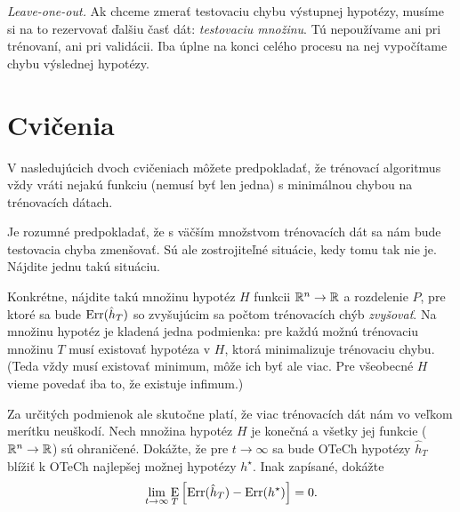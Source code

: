 \emph{Leave-one-out.} Ak chceme zmerať testovaciu chybu
výstupnej hypotézy, musíme si na to rezervovať ďalšiu časť dát:
\emph{testovaciu množinu}. Tú nepoužívame ani pri trénovaní, ani
pri validácii. Iba úplne na konci celého procesu na nej vypočítame
chybu výslednej hypotézy.




\section{Cvičenia}

V nasledujúcich dvoch cvičeniach môžete predpokladať, že trénovací
algoritmus vždy vráti nejakú funkciu (nemusí byť len jedna)
s minimálnou chybou na trénovacích dátach.

\begin{exercise}
  Je rozumné predpokladať, že s väčším množstvom trénovacích dát sa nám
  bude testovacia chyba zmenšovať. Sú ale zostrojiteľné situácie, kedy
  tomu tak nie je. Nájdite jednu takú situáciu.
  
  Konkrétne, nájdite takú množinu hypotéz $H$ funkcii $\mathbb{R}^n \to \mathbb{R}$
  a rozdelenie $P$, pre ktoré sa bude $\mathrm{Err}(\hat{h}_T)$ so zvyšujúcim
  sa počtom trénovacích chýb \emph{zvyšovať}. Na množinu hypotéz je
  kladená jedna podmienka: pre každú možnú trénovaciu množinu $T$
  musí existovať hypotéza v $H$, ktorá minimalizuje trénovaciu chybu.
  (Teda vždy musí existovať minimum, môže ich byť ale viac. Pre všeobecné
  $H$ vieme povedať iba to, že existuje infimum.)
\end{exercise}

\begin{exercise}
  Za určitých podmienok ale skutočne platí, že viac trénovacích dát
  nám vo veľkom merítku neuškodí. Nech množina hypotéz $H$ je konečná
  a všetky jej funkcie ($\mathbb{R}^n \to \mathbb{R}$) sú ohraničené. Dokážte, že
  pre $t \to \infty$ sa bude OTeCh hypotézy $\hat{h}_T$ blížiť k
  OTeCh najlepšej možnej hypotézy $h^\star$. Inak zapísané, dokážte
  $$\lim_{t \to \infty} \operatorname*{\mathrm{E}}_T \left[ \mathrm{Err}(\hat{h}_T) - \mathrm{Err}(h^\star) \right] = 0.$$
\end{exercise}

